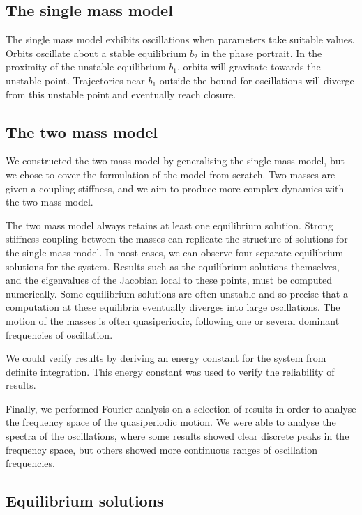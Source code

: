 \documentclass{report}
\begin{document}
\subsection{The single mass model}

The single mass model exhibits oscillations when parameters take suitable values.
Orbits oscillate about a stable equilibrium $b_2$ in the phase portrait.
In the proximity of the unstable equilibrium $b_1$,
orbits will gravitate towards the unstable point.
Trajectories near $b_1$ outside the bound for oscillations will diverge from this unstable point and eventually reach closure.

\subsection{The two mass model}

We constructed the two mass model by generalising the single mass model,
but we chose to cover the formulation of the model from scratch.
Two masses are given a coupling stiffness,
and we aim to produce more complex dynamics with the two mass model.

The two mass model always retains at least one equilibrium solution.
Strong stiffness coupling between the masses can replicate the structure of solutions for the single mass model.
In most cases,
we can observe four separate equilibrium solutions for the system.
Results such as the equilibrium solutions themselves, and the eigenvalues of the Jacobian local to these points,
must be computed numerically.
Some equilibrium solutions are often unstable and so precise that a computation at these equilibria eventually diverges into large oscillations.
The motion of the masses is often quasiperiodic,
following one or several dominant frequencies of oscillation.

We could verify results by deriving an energy constant for the system from definite integration.
This energy constant was used to verify the reliability of results.

Finally, we performed Fourier analysis on a selection of results in order to analyse the frequency space of the quasiperiodic motion.
We were able to analyse the spectra of the oscillations,
where some results showed clear discrete peaks in the frequency space,
but others showed more continuous ranges of oscillation frequencies.

\subsection{Equilibrium solutions}
\end{document}

